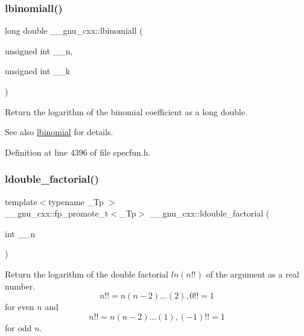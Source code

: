 \subsubsection{\texorpdfstring{lbinomiall()}{lbinomiall()}}
{\footnotesize\ttfamily long double \+\_\+\+\_\+gnu\+\_\+cxx\+::lbinomiall (\begin{DoxyParamCaption}\item[{unsigned int}]{\+\_\+\+\_\+n,  }\item[{unsigned int}]{\+\_\+\+\_\+k }\end{DoxyParamCaption})\hspace{0.3cm}{\ttfamily [inline]}}

Return the logarithm of the binomial coefficient as a {\ttfamily long double}.

\begin{DoxySeeAlso}{See also}
\hyperlink{group__gnu__math__spec__func_gabfa5aeba56edfa110846fc8e76963bc2}{lbinomial} for details. 
\end{DoxySeeAlso}


Definition at line 4396 of file specfun.\+h.

\mbox{\label{group__gnu__math__spec__func_ga43bf9a20282d5b9237bf352682a48395}} 
\subsubsection{\texorpdfstring{ldouble\+\_\+factorial()}{ldouble\_factorial()}}
{\footnotesize\ttfamily template$<$typename \+\_\+\+Tp $>$ \\
\+\_\+\+\_\+gnu\+\_\+cxx\+::fp\+\_\+promote\+\_\+t$<$\+\_\+\+Tp$>$ \+\_\+\+\_\+gnu\+\_\+cxx\+::ldouble\+\_\+factorial (\begin{DoxyParamCaption}\item[{int}]{\+\_\+\+\_\+n }\end{DoxyParamCaption})\hspace{0.3cm}{\ttfamily [inline]}}



Return the logarithm of the double factorial $ ln(n!!) $ of the argument as a real number. \[ n!! = n(n-2)...(2), 0!! = 1 \] for even $ n $ and \[ n!! = n(n-2)...(1), (-1)!! = 1 \] for odd $ n $. 



